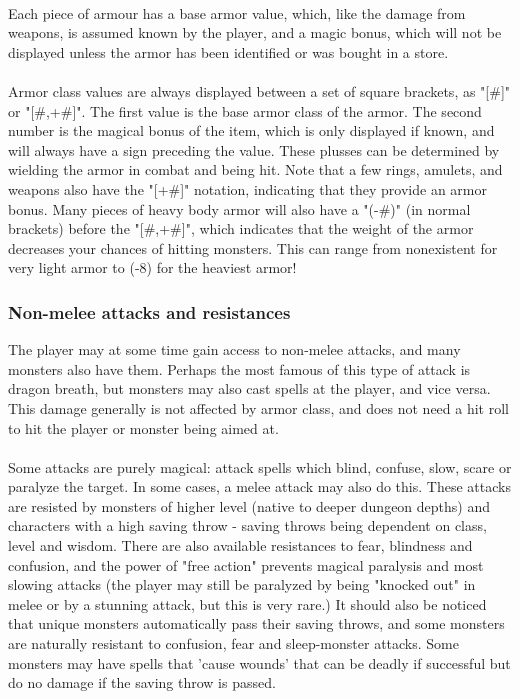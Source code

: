 \paragraph{}Each piece of armour has a base armor value, which, like the damage from
weapons, is assumed known by the player, and a magic bonus, which will not
be displayed unless the armor has been identified or was bought in a store.

\paragraph{}Armor class values are always displayed between a set of square brackets,
as "[\#]" or "[\#,+\#]". The first value is the base armor class of the armor.
The second number is the magical bonus of the item, which is only displayed
if known, and will always have a sign preceding the value. These plusses can
be determined by wielding the armor in combat and being hit. Note that a few
rings, amulets, and weapons also have the "[+\#]" notation, indicating that
they provide an armor bonus. Many pieces of heavy body armor will also have
a "(-\#)" (in normal brackets) before the "[\#,+\#]", which indicates that the
weight of the armor decreases your chances of hitting monsters. This can
range from nonexistent for very light armor to (-8) for the heaviest armor!


\subsubsection{Non-melee attacks and resistances}

The player may at some time gain access to non-melee attacks, and many
monsters also have them. Perhaps the most famous of this type of attack is
dragon breath, but monsters may also cast spells at the player, and vice
versa. This damage generally is not affected by armor class, and does not
need a hit roll to hit the player or monster being aimed at.

\paragraph{}Some attacks are purely magical: attack spells which blind, confuse, slow,
scare or paralyze the target. In some cases, a melee attack may also do
this. These attacks are resisted by monsters of higher level (native to
deeper dungeon depths) and characters with a high saving throw - saving
throws being dependent on class, level and wisdom. There are also available
resistances to fear, blindness and confusion, and the power of "free
action" prevents magical paralysis and most slowing attacks (the player may
still be paralyzed by being "knocked out" in melee or by a stunning attack,
but this is very rare.) It should also be noticed that unique monsters
automatically pass their saving throws, and some monsters are naturally
resistant to confusion, fear and sleep-monster attacks. Some monsters may
have spells that 'cause wounds' that can be deadly if successful but do no
damage if the saving throw is passed.

